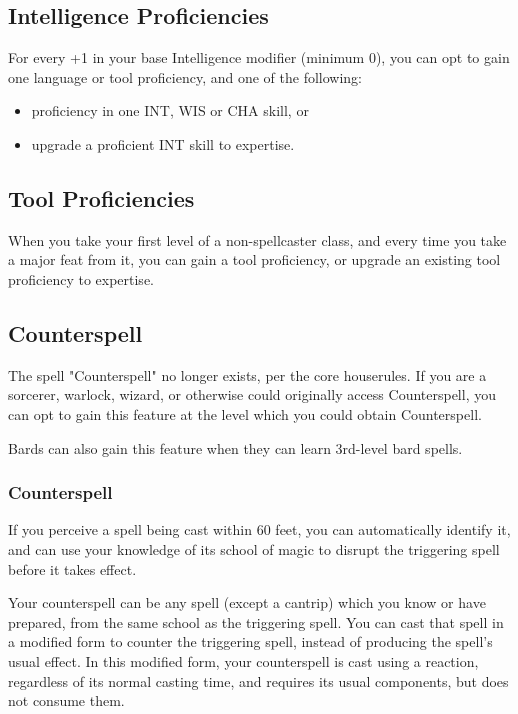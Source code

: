 \documentclass[letterpaper,twocolumn,openany,nodeprecatedcode,bg=print]{dndbook}
\begin{document}
\subsection{Intelligence Proficiencies}
For every +1 in your base Intelligence modifier (minimum 0), 
you can opt to gain one language or tool proficiency, and one of the following:
\begin{itemize}
    \item proficiency in one INT, WIS or CHA skill, or
    \item upgrade a proficient INT skill to expertise.
\end{itemize}

\subsection{Tool Proficiencies}
When you take your first level of a non-spellcaster class, and every time you take a major feat from it, 
you can gain a tool proficiency, or upgrade an existing tool proficiency to expertise. 

\subsection{Counterspell}
\label{counterspell}
The spell "Counterspell" no longer exists, per the core houserules.
If you are a sorcerer, warlock, wizard, or otherwise could originally access Counterspell,
you can opt to gain this feature at the level which you could obtain Counterspell.

Bards can also gain this feature when they can learn 3rd-level bard spells.

\subsubsection{Counterspell}
If you perceive a spell being cast within 60 feet, 
you can automatically identify it, 
and can use your knowledge of its school of magic to disrupt the triggering spell before it takes effect.

Your counterspell can be any spell (except a cantrip) which you know or have prepared, from the same school as the triggering spell.
You can cast that spell in a modified form to counter the triggering spell, instead of producing the spell's usual effect. 
In this modified form, your counterspell is cast using a reaction, regardless of its normal casting time, 
and requires its usual components, but does not consume them.
\end{document}
